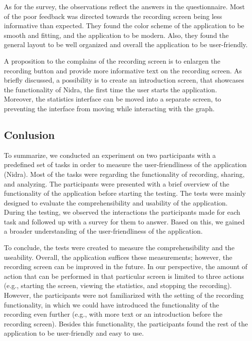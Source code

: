 As for the survey, the observations reflect the answers in the questionnaire. Most of the poor feedback was directed towards the recording screen being less informative than expected. They found the color scheme of the application to be smooth and fitting, and the application to be modern. Also, they found the general layout to be well organized and overall the application to be user-friendly.

A proposition to the complains of the recording screen is to enlargen the recording button and provide more informative text on the recording screen. As briefly discussed, a possibility is to create an introduction screen, that showcases the functionality of Nidra, the first time the user starts the application. Moreover, the statistics interface can be moved into a separate screen, to preventing the interface from moving while interacting with the graph.

\subsection{Conlusion}

To summarize, we conducted an experiment on two participants with a predefined set of tasks in order to measure the user-friendliness of the application (Nidra). Most of the tasks were regarding the functionality of recording, sharing, and analyzing. The participants were presented with a brief overview of the functionality of the application before starting the testing. The tests were mainly designed to evaluate the comprehensibility and usability of the application. During the testing, we observed the interactions the participants made for each task and followed up with a survey for them to answer. Based on this, we gained a broader understanding of the user-friendliness of the application.

To conclude, the tests were created to measure the comprehensibility and the useability. Overall, the application suffices these measurements; however, the recording screen can be improved in the future. In our perspective, the amount of action that can be performed in that particular screen is limited to three actions (e.g., starting the screen, viewing the statistics, and stopping the recording). However, the participants were not familiarized with the setting of the recording functionality, in which we could have introduced the functionality of the recording even further (e.g., with more text or an introduction before the recording screen). Besides this functionality, the participants found the rest of the application to be user-friendly and easy to use.


